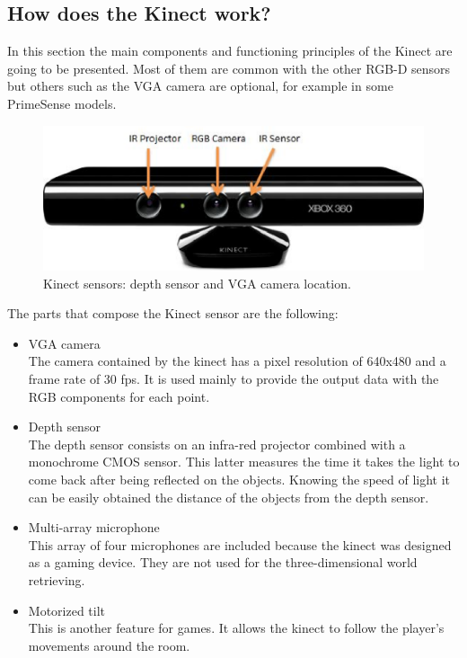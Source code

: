 \subsection*{How does the Kinect work?}
In this section the main components and functioning principles of the Kinect are going to be presented. Most of them are common with the other RGB-D sensors but others such as the VGA camera are optional, for example in some PrimeSense\cite{PrimeSense} models. 



\begin{figure}[h]
	\begin{center}
\includegraphics[scale=0.5]{img/kinect/kinect2.eps}
	\caption[Kinect Sensors]{Kinect sensors: depth sensor and VGA camera location.}
	\end{center}
\end{figure}


The parts that compose the Kinect sensor are the following: 

\begin{itemize}
	\item{VGA camera}\\
	The camera contained by the kinect has a pixel resolution of 640x480 and a frame rate of 30 fps. It is used mainly to provide the output data with the RGB components for each point. 
	
	\item{Depth sensor}\\
	The depth sensor consists on an infra-red projector combined with a monochrome CMOS sensor. This latter measures the time it takes the light to come back after being reflected on the objects. Knowing the speed of light it can be easily obtained the distance of the objects from the depth sensor. 

	\item{Multi-array microphone}\\
	This array of four microphones are included because the kinect was designed as a gaming device. They are not used for the three-dimensional world retrieving. 
	
	\item{Motorized tilt}\\
	This is another feature for games. It allows the kinect to follow the player's movements around the room. \cite{howkinectworks}
\end{itemize}



